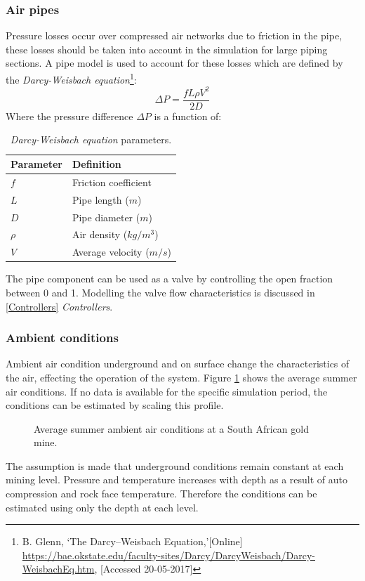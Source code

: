 		\subsubsection{Air pipes}
		Pressure losses occur over compressed air networks due to friction in the pipe, these losses should be taken into account in the simulation for large piping sections. A pipe model is used to account for these losses which are defined by the \textit{Darcy-Weisbach equation}\footnote{ B. Glenn, \enquote*{The Darcy–Weisbach Equation,}[Online] \url{https://bae.okstate.edu/faculty-sites/Darcy/DarcyWeisbach/Darcy-WeisbachEq.htm}, [Accessed 20-05-2017]}:
		$$\Delta P = \frac{f  L \rho V^2}{2 D}$$
		Where the pressure difference $\Delta P $ is a function of:\\
		\begin{table}[h]
			\centering
			\begin{tabular}{ll}
				\hline
				Parameter & Definition\\
				\hline
				$f$ & Friction coefficient  \\
				$L$ & Pipe length ($m$) \\
				$D$ & Pipe diameter ($m$) \\
				$\rho$ & Air density ($kg/m^3$)\\	
				$V$ & Average velocity ($m/s$) \\	
				\hline
			\end{tabular} 
		\caption{\textit{Darcy-Weisbach equation} parameters.}
		\label{table: Darcy-Weisbach}
		\end{table}
		
		The pipe component can be used as a valve by controlling the open fraction between 0 and 1. Modelling the valve flow characteristics is discussed in \ref{Controllers} \textit{Controllers}.
		\subsubsection{Ambient conditions}
		Ambient air condition underground and on surface change the characteristics of the air, effecting the operation of the system. Figure \ref{fig: Ambient} shows the average summer air conditions. If no data is available for the specific simulation period, the conditions can be estimated by scaling this profile. 
		\begin{figure}[h]
			\centering
			\fbox{}
			\caption{Average summer ambient air conditions at a South African gold mine.}
			\label{fig: Ambient}
		\end{figure}
		The assumption is made that underground conditions remain constant at each mining level. Pressure and temperature increases with depth as a result of auto compression and rock face temperature. Therefore the conditions can be estimated using only the depth at each level.   

